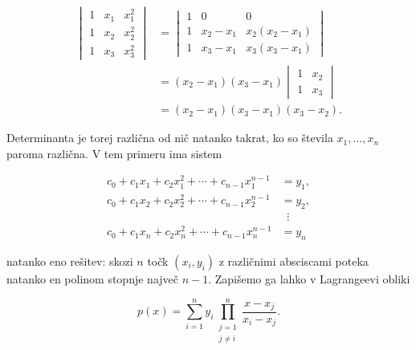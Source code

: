 \documentclass[a4paper]{article}
\begin{document}
\[\begin{aligned}
\begin{vmatrix} 1 & x_1 & x_1^2 \\ 1 & x_2 & x_2^2 \\ 1 & x_3 & x_3^2 \end{vmatrix}
&= \begin{vmatrix} 1 & 0 & 0 \\ 1 & x_2 - x_1 & x_2(x_2 - x_1) \\ 1 & x_3 - x_1 & x_3(x_3 - x_1) \end{vmatrix} \\
&= (x_2 - x_1)(x_3 - x_1) \begin{vmatrix} 1 & x_2 \\ 1 & x_3 \end{vmatrix} \\
&= (x_2 - x_1)(x_3 - x_1)(x_3 - x_2).
\end{aligned}\]

Determinanta je torej različna od nič natanko takrat, ko so števila
\(x_1, \ldots, x_n\) paroma različna. V tem primeru ima sistem

\[\begin{aligned}
c_0 + c_1 x_1 + c_2 x_1^2 + \cdots + c_{n-1} x_1^{n-1} &= y_1, \\
c_0 + c_1 x_2 + c_2 x_2^2 + \cdots + c_{n-1} x_2^{n-1} &= y_2, \\
&\;\;\vdots \\
c_0 + c_1 x_n + c_2 x_n^2 + \cdots + c_{n-1} x_n^{n-1} &= y_n
\end{aligned}\]

natanko eno rešitev: skozi \(n\) točk \((x_i, y_i)\) z različnimi
absciscami poteka natanko en polinom stopnje največ \(n - 1\). Zapišemo
ga lahko v Lagrangeevi obliki

\[p(x) = \sum_{i=1}^{n} y_i \prod_{\substack{j = 1 \\ j \neq i}}^{n} \frac{x - x_j}{x_i - x_j}.\]
\end{document}
